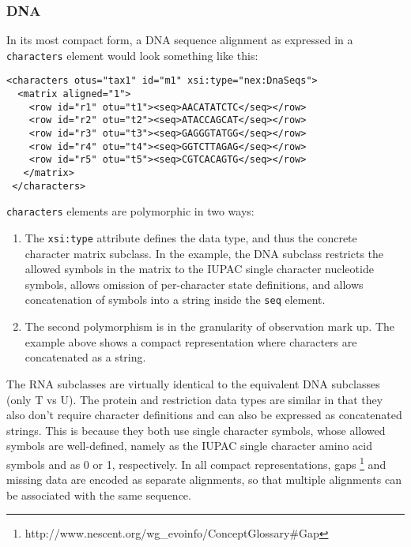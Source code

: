 \documentclass{article}
\newcommand{\code}{\texttt}
\begin{document}
\subsubsection{DNA}
In its most compact form, a DNA sequence alignment as expressed in a \code{characters} element would look something like this:
\begin{verbatim}
<characters otus="tax1" id="m1" xsi:type="nex:DnaSeqs">
  <matrix aligned="1">
    <row id="r1" otu="t1"><seq>AACATATCTC</seq></row>
    <row id="r2" otu="t2"><seq>ATACCAGCAT</seq></row>
    <row id="r3" otu="t3"><seq>GAGGGTATGG</seq></row>
    <row id="r4" otu="t4"><seq>GGTCTTAGAG</seq></row>
    <row id="r5" otu="t5"><seq>CGTCACAGTG</seq></row> 
   </matrix>		
 </characters>
\end{verbatim}
\code{characters} elements are polymorphic in two ways:

\begin{enumerate}

\item The \code{xsi:type} attribute defines the data type, and thus the concrete character matrix subclass. In the example, the 
DNA subclass restricts the allowed symbols in the matrix to the IUPAC single character nucleotide symbols, allows omission of 
per-character state definitions, and allows concatenation of symbols into a string inside the \code{seq} element.

\item The second polymorphism is in the granularity of observation mark up. The example above shows a compact representation where 
characters are concatenated as a string.

\end{enumerate} 

The RNA subclasses are virtually identical to the equivalent DNA subclasses (only T vs U). The protein and restriction data types 
are similar in that they also don't require character definitions and can also be expressed as concatenated strings. This is because 
they both use single character symbols, whose allowed symbols are well-defined, namely as the IUPAC single character amino acid 
symbols and as 0 or 1, respectively. In all compact representations, gaps \footnote{http://www.nescent.org/wg\_evoinfo/ConceptGlossary\#Gap} 
and missing data are encoded as separate alignments, so that multiple alignments can be associated with the same sequence.
\end{document}
